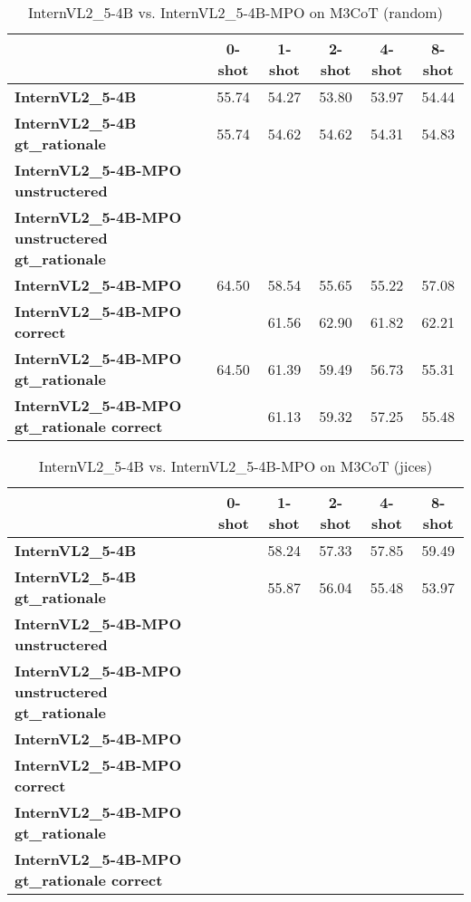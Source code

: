 \begin{table}
\caption{InternVL2\_5-4B vs. InternVL2\_5-4B-MPO on M3CoT (random)}
\label{tab:InternVL2_5-4B_M3CoT_TRAIN_random}
\begin{tabular}{lccccc}
\toprule
 & 0-shot & 1-shot & 2-shot & 4-shot & 8-shot \\
\midrule
\textbf{InternVL2\_5-4B} & 55.74 & 54.27 & 53.80 & 53.97 & 54.44 \\
\textbf{InternVL2\_5-4B gt\_rationale} & 55.74 & 54.62 & 54.62 & 54.31 & 54.83 \\
\textbf{InternVL2\_5-4B-MPO unstructered} &  &  &  &  &  \\
\textbf{InternVL2\_5-4B-MPO unstructered gt\_rationale} &  &  &  &  &  \\
\textbf{InternVL2\_5-4B-MPO} & 64.50 & 58.54 & 55.65 & 55.22 & 57.08 \\
\textbf{InternVL2\_5-4B-MPO correct} &  & 61.56 & 62.90 & 61.82 & 62.21 \\
\textbf{InternVL2\_5-4B-MPO gt\_rationale} & 64.50 & 61.39 & 59.49 & 56.73 & 55.31 \\
\textbf{InternVL2\_5-4B-MPO gt\_rationale correct} &  & 61.13 & 59.32 & 57.25 & 55.48 \\
\bottomrule
\end{tabular}
\end{table}


\begin{table}
\caption{InternVL2\_5-4B vs. InternVL2\_5-4B-MPO on M3CoT (jices)}
\label{tab:InternVL2_5-4B_M3CoT_TRAIN_jices}
\begin{tabular}{lccccc}
\toprule
 & 0-shot & 1-shot & 2-shot & 4-shot & 8-shot \\
\midrule
\textbf{InternVL2\_5-4B} &  & 58.24 & 57.33 & 57.85 & 59.49 \\
\textbf{InternVL2\_5-4B gt\_rationale} &  & 55.87 & 56.04 & 55.48 & 53.97 \\
\textbf{InternVL2\_5-4B-MPO unstructered} &  &  &  &  &  \\
\textbf{InternVL2\_5-4B-MPO unstructered gt\_rationale} &  &  &  &  &  \\
\textbf{InternVL2\_5-4B-MPO} &  &  &  &  &  \\
\textbf{InternVL2\_5-4B-MPO correct} &  &  &  &  &  \\
\textbf{InternVL2\_5-4B-MPO gt\_rationale} &  &  &  &  &  \\
\textbf{InternVL2\_5-4B-MPO gt\_rationale correct} &  &  &  &  &  \\
\bottomrule
\end{tabular}
\end{table}


